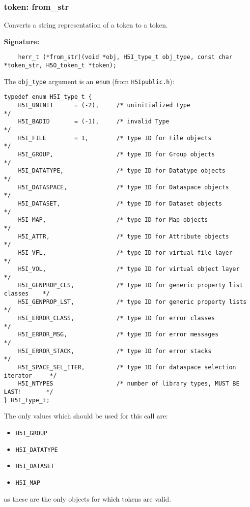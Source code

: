 \subsubsection{token: from\_str}
Converts a string representation of a token to a token.

\begin{mdframed}[style=bgbox]
\textbf{Signature:}
\begin{lstlisting}
    herr_t (*from_str)(void *obj, H5I_type_t obj_type, const char *token_str, H5O_token_t *token);
\end{lstlisting}

The \texttt{obj\_type} argument is an \texttt{enum} (from \texttt{H5Ipublic.h}):
\begin{lstlisting}
typedef enum H5I_type_t {                                                        
    H5I_UNINIT      = (-2),     /* uninitialized type                           */
    H5I_BADID       = (-1),     /* invalid Type                                 */
    H5I_FILE        = 1,        /* type ID for File objects                     */
    H5I_GROUP,                  /* type ID for Group objects                    */
    H5I_DATATYPE,               /* type ID for Datatype objects                 */
    H5I_DATASPACE,              /* type ID for Dataspace objects                */
    H5I_DATASET,                /* type ID for Dataset objects                  */
    H5I_MAP,                    /* type ID for Map objects                      */
    H5I_ATTR,                   /* type ID for Attribute objects                */
    H5I_VFL,                    /* type ID for virtual file layer               */
    H5I_VOL,                    /* type ID for virtual object layer             */
    H5I_GENPROP_CLS,            /* type ID for generic property list classes    */
    H5I_GENPROP_LST,            /* type ID for generic property lists           */
    H5I_ERROR_CLASS,            /* type ID for error classes                    */
    H5I_ERROR_MSG,              /* type ID for error messages                   */
    H5I_ERROR_STACK,            /* type ID for error stacks                     */
    H5I_SPACE_SEL_ITER,         /* type ID for dataspace selection iterator     */
    H5I_NTYPES                  /* number of library types, MUST BE LAST!       */
} H5I_type_t;
\end{lstlisting}
The only values which should be used for this call are:
\begin{itemize}
    \item \texttt{H5I\_GROUP}
    \item \texttt{H5I\_DATATYPE}
    \item \texttt{H5I\_DATASET}
    \item \texttt{H5I\_MAP}
\end{itemize}
as these are the only objects for which tokens are valid.


\end{mdframed}
